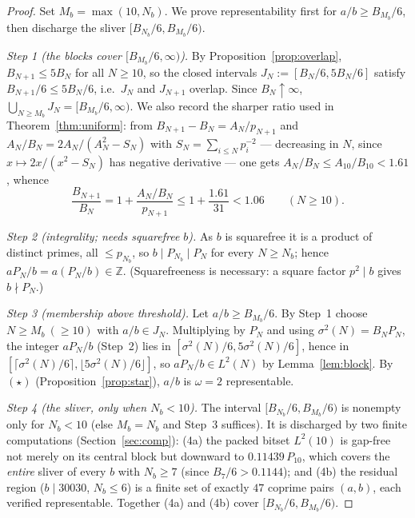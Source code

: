 \documentclass[11pt]{amsart}
\theoremstyle{plain}
\theoremstyle{definition}
\newcommand{\Z}{\mathbb{Z}}
\begin{document}
\begin{proof}
Set $M_b=\max(10,N_b)$.  We prove representability first for $a/b\ge B_{M_b}/6$,
then discharge the sliver $[B_{N_b}/6,B_{M_b}/6)$.

\emph{Step 1 (the blocks cover $[B_{M_b}/6,\infty)$).}  By
Proposition~\ref{prop:overlap}, $B_{N+1}\le 5B_N$ for all $N\ge 10$, so the closed
intervals $J_N:=[B_N/6,5B_N/6]$ satisfy $B_{N+1}/6\le 5B_N/6$, i.e.\ $J_N$ and
$J_{N+1}$ overlap.  Since $B_N\uparrow\infty$,
$\bigcup_{N\ge M_b}J_N=[B_{M_b}/6,\infty)$.  We also record the sharper ratio used
in Theorem~\ref{thm:uniform}: from $B_{N+1}-B_N=A_N/p_{N+1}$ and
$A_N/B_N=2A_N/(A_N^2-S_N)$ with $S_N=\sum_{i\le N}p_i^{-2}$ --- decreasing in $N$,
since $x\mapsto 2x/(x^2-S_N)$ has negative derivative --- one gets
$A_N/B_N\le A_{10}/B_{10}<1.61$, whence
\begin{equation}\label{eq:ratio}
  \frac{B_{N+1}}{B_N}=1+\frac{A_N/B_N}{p_{N+1}}\le 1+\frac{1.61}{31}<1.06
  \qquad(N\ge 10).
\end{equation}

\emph{Step 2 (integrality; needs squarefree $b$).}  As $b$ is squarefree it is a
product of distinct primes, all $\le p_{N_b}$, so $b\mid P_{N_b}\mid P_N$ for every
$N\ge N_b$; hence $aP_N/b=a(P_N/b)\in\Z$.  (Squarefreeness is necessary: a square
factor $p^2\mid b$ gives $b\nmid P_N$.)

\emph{Step 3 (membership above threshold).}  Let $a/b\ge B_{M_b}/6$.  By Step~1
choose $N\ge M_b\ (\ge 10)$ with $a/b\in J_N$.  Multiplying by $P_N$ and using
$\sigma^2(N)=B_NP_N$, the integer $aP_N/b$ (Step~2) lies in
$[\sigma^2(N)/6,5\sigma^2(N)/6]$, hence in
$[\lceil\sigma^2(N)/6\rceil,\lfloor5\sigma^2(N)/6\rfloor]$, so $aP_N/b\in L^2(N)$
by Lemma~\ref{lem:block}.  By $(\star)$ (Proposition~\ref{prop:star}), $a/b$ is
$\omega=2$ representable.

\emph{Step 4 (the sliver, only when $N_b<10$).}  The interval
$[B_{N_b}/6,B_{M_b}/6)$ is nonempty only for $N_b<10$ (else $M_b=N_b$ and Step~3
suffices).  It is discharged by two finite computations
(Section~\ref{sec:comp}): \textup{(4a)} the packed bitset $L^2(10)$ is gap-free
not merely on its central block but downward to $0.11439\,P_{10}$, which covers the
\emph{entire} sliver of every $b$ with $N_b\ge 7$ (since $B_7/6>0.1144$); and
\textup{(4b)} the residual region ($b\mid 30030$, $N_b\le 6$) is a finite set of
exactly $47$ coprime pairs $(a,b)$, each verified representable.  Together (4a) and
(4b) cover $[B_{N_b}/6,B_{M_b}/6)$.
\end{proof}
\end{document}

